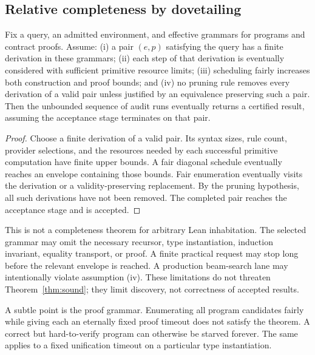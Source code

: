 \subsection{Relative completeness by dovetailing}
\begin{theorem}
\label{thm:complete}
Fix a query, an admitted environment, and effective grammars for programs and contract proofs. Assume: (i) a pair $(e,p)$ satisfying the query has a finite derivation in these grammars; (ii) each step of that derivation is eventually considered with sufficient primitive resource limits; (iii) scheduling fairly increases both construction and proof bounds; and (iv) no pruning rule removes every derivation of a valid pair unless justified by an equivalence preserving such a pair. Then the unbounded sequence of audit runs eventually returns a certified result, assuming the acceptance stage terminates on that pair.
\end{theorem}
\begin{proof}
Choose a finite derivation of a valid pair. Its syntax sizes, rule count, provider selections, and the resources needed by each successful primitive computation have finite upper bounds. A fair diagonal schedule eventually reaches an envelope containing those bounds. Fair enumeration eventually visits the derivation or a validity-preserving replacement. By the pruning hypothesis, all such derivations have not been removed. The completed pair reaches the acceptance stage and is accepted.
\end{proof}
This is not a completeness theorem for arbitrary Lean inhabitation. The selected grammar may omit the necessary recursor, type instantiation, induction invariant, equality transport, or proof. A finite practical request may stop long before the relevant envelope is reached. A production beam-search lane may intentionally violate assumption (iv). These limitations do not threaten Theorem~\ref{thm:sound}; they limit discovery, not correctness of accepted results.

A subtle point is the proof grammar. Enumerating all program candidates fairly while giving each an eternally fixed proof timeout does not satisfy the theorem. A correct but hard-to-verify program can otherwise be starved forever. The same applies to a fixed unification timeout on a particular type instantiation.

